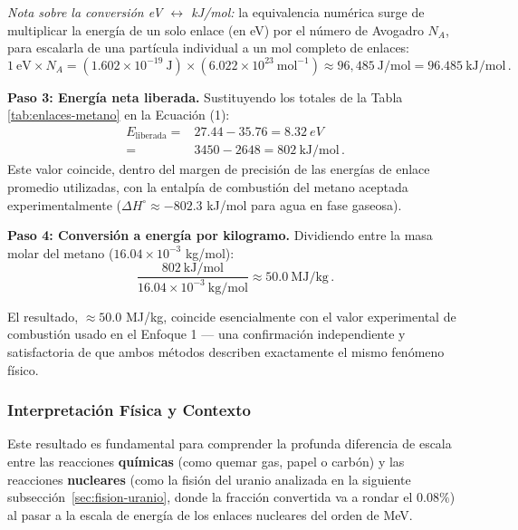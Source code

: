 \documentclass[11pt,a4paper]{book}
\begin{document}
\medskip
\noindent\textit{Nota sobre la conversión eV $\leftrightarrow$ kJ/mol:} la equivalencia
numérica surge de multiplicar la energía de un solo enlace (en eV) por el número de
Avogadro $N_A$, para escalarla de una partícula individual a un mol completo de enlaces:
\begin{equation}
    1\ \text{eV}\times N_A = \left(1.602\times10^{-19}\ \text{J}\right)\times
    \left(6.022\times10^{23}\ \text{mol}^{-1}\right) \approx 96{,}485\ \text{J/mol}
    = 96.485\ \text{kJ/mol}\,.
\end{equation}

\medskip
\noindent\textbf{Paso 3: Energía neta liberada.} Sustituyendo los totales de la Tabla
\ref{tab:enlaces-metano} en la Ecuación (1):
\begin{align}
    E_{\text{liberada}} =&27.44-35.76=\qty{8.32}{eV} \nonumber\\
    =&3450 - 2648 = 802\ \text{kJ/mol}\,.
\end{align}
Este valor coincide, dentro del margen de precisión de las energías de enlace promedio
utilizadas, con la entalpía de combustión del metano aceptada experimentalmente
($\Delta H^\circ \approx -802.3$ kJ/mol para agua en fase gaseosa).

\medskip
\noindent\textbf{Paso 4: Conversión a energía por kilogramo.} Dividiendo entre la masa
molar del metano ($16.04\times10^{-3}$ kg/mol):
\begin{equation}
    \frac{802\ \text{kJ/mol}}{16.04\times10^{-3}\ \text{kg/mol}} \approx 50.0\ \text{MJ/kg}\,.
\end{equation}

El resultado, $\approx 50.0$ MJ/kg, coincide esencialmente
con el valor experimental de combustión usado en el Enfoque 1 --- una confirmación
independiente y satisfactoria de que ambos métodos describen exactamente el mismo
fenómeno físico. 

\subsubsection*{Interpretación Física y Contexto}

Este resultado es fundamental para comprender la profunda diferencia de escala entre las reacciones \textbf{químicas} (como quemar gas, papel o carbón) y las reacciones \textbf{nucleares} (como la fisión del uranio analizada en la siguiente subsección~\ref{sec:fision-uranio}, donde la fracción convertida va a rondar el $0.08\%$) al pasar a la escala de energía de los enlaces nucleares del orden de MeV. 
\end{document}
